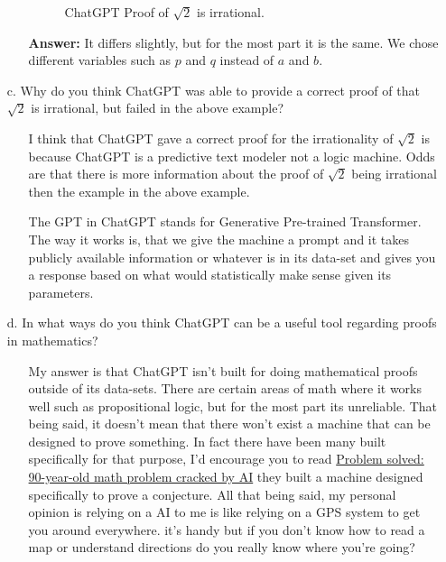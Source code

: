 \documentclass{article}
\begin{document}
\begin{itemize}
\begin{itemize}
\begin{figure}[H]
    \caption{ChatGPT Proof of $\sqrt{2}$ is irrational.}
    \label{fig:example}
\end{figure}
\item[]
\item[] \textbf{Answer:} It differs slightly, but for the most part it is the same. We chose different variables such as $p$ and $q$ instead of $a$ and $b$.
\item[]
\end{itemize}
    \item[c.] Why do you think ChatGPT was able to provide a correct proof of that $\sqrt{2}$ is irrational, but failed in the above example?
    \begin{itemize}
        \item[] I think that ChatGPT gave a correct proof for the irrationality of $\sqrt{2}$ is because ChatGPT is a predictive text modeler not a logic machine. 
        Odds are that there is more information about the proof of $\sqrt{2}$ being irrational then the example in the above example. 
        \item[] The GPT in ChatGPT stands for Generative Pre-trained Transformer. The way it works is, that we give the machine a prompt and it takes publicly available information 
         or whatever is in its data-set and gives you a response based on what would statistically make sense given its parameters. 
        \end{itemize}
        \newpage
    \item[d.] In what ways do you think ChatGPT can be a useful tool regarding proofs in mathematics? 
        \begin{itemize}
            \item[] My answer is that ChatGPT isn't built for doing mathematical proofs outside of its data-sets. There are certain areas of math where it works well such as propositional logic, but for the most part its unreliable.
         That being said, it doesn't mean that there won't exist a machine that can be designed to prove something. In fact there have been many built specifically for that purpose, 
         I'd encourage you to read \href{https://www.popularmechanics.com/science/math/a33820013/keller-conjecture-old-math-problem-solved/}{Problem solved: 90-year-old math problem cracked by AI} 
        they built a machine designed specifically to prove a conjecture. All that being said, my personal opinion is relying on a AI to me is like relying on a GPS system to get you around everywhere.
         it's handy but if you don't know how to read a map or understand directions do you really know where you're going?
        \end{itemize}
 \end{itemize}
\end{document}
